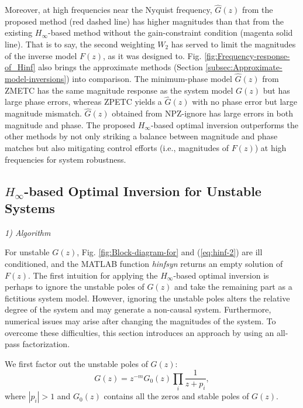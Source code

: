\documentclass [11pt, proquest] {uwthesis}[2020/02/24]
\begin{document}
 Moreover, at high frequencies near the Nyquist frequency, $\hat{G}(z)$
from the proposed method (red dashed line) has higher magnitudes than
that from the existing $H_{\infty}$-based method without the gain-constraint
condition (magenta solid line). That is to say, the second weighting
$W_{2}$ has served to limit the magnitudes of the inverse model $F(z)$,
as it was designed to. Fig. \ref{fig:Frequency-response-of_Hinf}
also brings the approximate methods (Section \ref{subsec:Approximate-model-inversions})
into comparison. The minimum-phase model $\hat{G}(z)$ from ZMETC
has the same magnitude response as the system model $G(z)$ but has
large phase errors, whereas ZPETC yields a $\hat{G}(z)$ with no phase
error but large magnitude mismatch. $\hat{G}(z)$ obtained from NPZ-ignore
has large errors in both magnitude and phase. The proposed $H_{\infty}$-based
optimal inversion outperforms the other methods by not only striking
a balance between magnitude and phase matches but also mitigating
control efforts (i.e., magnitudes of $F(z)$) at high frequencies
for system robustness.

\subsection{\label{subsec:-based-optimal-design}$H_{\infty}$-based Optimal
Inversion for Unstable Systems}

\noindent \emph{1) Algorithm}

For unstable $G(z)$, Fig. \ref{fig:Block-diagram-for} and (\ref{eq:hinf-2})
are ill conditioned, and the MATLAB function \emph{hinfsyn} returns
an empty solution of $F(z)$. The first intuition for applying the
$H_{\infty}$-based optimal inversion is perhaps to ignore the unstable
poles of $G(z)$ and take the remaining part as a fictitious system
model. However, ignoring the unstable poles alters the relative degree
of the system and may generate a non-causal system. Furthermore, numerical
issues may arise after changing the magnitudes of the system. To overcome
these difficulties, this section introduces an approach by using an
all-pass factorization.

We first factor out the unstable poles of $G(z)$:
\begin{equation}
G(z)=z^{-m}G_{0}(z)\prod_{i}\frac{1}{z+p_{i}},\label{eq:Lgen}
\end{equation}
where $|p_{i}|>1$ and $G_{0}(z)$ contains all the zeros and stable
poles of $G(z)$.
\end{document}

